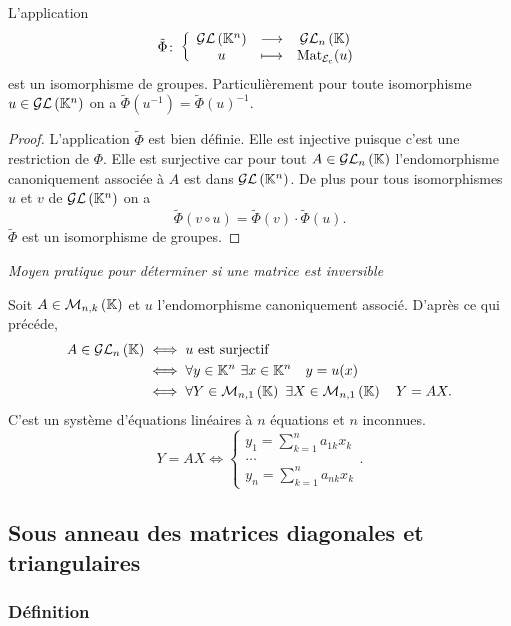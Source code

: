 \begin{theo}
  L'application
  \begin{equation}
    \tilde{\Phi}\colon \left\{\begin{array}{ccc} \mathcal{GL}\left(\mathbb{K}^n\right) & \longrightarrow &\mathcal{GL}_{n}\left(\mathbb{K}\right)\\ u & \longmapsto & \mathrm{Mat}_{\mathcal{E}_c}(u) \end{array} \right.
  \end{equation}
  est un isomorphisme de groupes. Particulièrement pour toute isomorphisme \(u \in \mathcal{GL}\left(\mathbb{K}^n\right)\) on a \(\tilde{\Phi}(u^{-1})=\tilde{\Phi}(u)^{-1}\).
\end{theo}
\begin{proof}
  L'application \(\tilde{\Phi}\) est bien définie. Elle est injective puisque c'est une restriction de \(\Phi\). Elle est surjective car pour tout \(A \in \mathcal{GL}_{n}\left(\mathbb{K}\right)\) l'endomorphisme canoniquement associée à \(A\) est dans \(\mathcal{GL}\left(\mathbb{K}^n\right)\). De plus pour tous isomorphismes \(u\) et \(v\) de \(\mathcal{GL}\left(\mathbb{K}^n\right)\) on a
\begin{equation}
  \tilde{\Phi}(v \circ u)= \tilde{\Phi}(v) \cdot \tilde{\Phi}(u).
\end{equation}
 \(\tilde{\Phi}\) est un isomorphisme de groupes.
\end{proof}

\emph{Moyen pratique pour déterminer si une matrice est inversible}

Soit \(A \in \mathcal{M}_{n,k}\left(\mathbb{K}\right)\) et \(u\) l'endomorphisme canoniquement associé. D'après ce qui précéde,
\begin{align}
  A \in \mathcal{GL}_{n}\left(\mathbb{K}\right) & \iff u \text{~est surjectif}\\
  & \iff \forall y \in \mathbb{K}^n \ \exists x \in \mathbb{K}^n \quad y=u(x)\\
  & \iff \forall Y \in \mathcal{M}_{n,1}\left(\mathbb{K}\right) \ \exists X \in \mathcal{M}_{n,1}\left(\mathbb{K}\right) \quad Y=AX.
\end{align}
C'est un système d'équations linéaires à \(n\) équations et \(n\) inconnues.
\begin{equation}
  Y=AX \iff \begin{cases} y_1 = \sum_{k=1}^n a_{1k} x_k \\ \ldots \\ y_n = \sum_{k=1}^n a_{nk} x_k \end{cases}.
\end{equation}

\subsection{Sous anneau des matrices diagonales et triangulaires}

\subsubsection{Définition}

